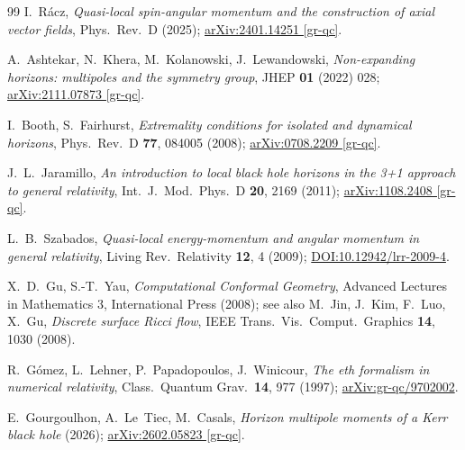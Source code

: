 \documentclass[11pt]{article}
\begin{document}
\begin{thebibliography}{99}
I.~R\'acz,
\emph{Quasi-local spin-angular momentum and the construction of axial
vector fields},
Phys.\ Rev.\ D (2025);
\href{https://arxiv.org/abs/2401.14251}{arXiv:2401.14251 [gr-qc]}.

A.~Ashtekar, N.~Khera, M.~Kolanowski, J.~Lewandowski,
\emph{Non-expanding horizons: multipoles and the symmetry group},
JHEP \textbf{01} (2022) 028;
\href{https://arxiv.org/abs/2111.07873}{arXiv:2111.07873 [gr-qc]}.

I.~Booth, S.~Fairhurst,
\emph{Extremality conditions for isolated and dynamical horizons},
Phys.\ Rev.\ D \textbf{77}, 084005 (2008);
\href{https://arxiv.org/abs/0708.2209}{arXiv:0708.2209 [gr-qc]}.

J.~L.~Jaramillo,
\emph{An introduction to local black hole horizons in the 3+1 approach to
general relativity},
Int.\ J.\ Mod.\ Phys.\ D \textbf{20}, 2169 (2011);
\href{https://arxiv.org/abs/1108.2408}{arXiv:1108.2408 [gr-qc]}.

L.~B.~Szabados,
\emph{Quasi-local energy-momentum and angular momentum in general
relativity},
Living Rev.\ Relativity \textbf{12}, 4 (2009);
\href{https://doi.org/10.12942/lrr-2009-4}{DOI:10.12942/lrr-2009-4}.

X.~D.~Gu, S.-T.~Yau,
\emph{Computational Conformal Geometry},
Advanced Lectures in Mathematics 3, International Press (2008);
see also M.~Jin, J.~Kim, F.~Luo, X.~Gu,
\emph{Discrete surface Ricci flow},
IEEE Trans.\ Vis.\ Comput.\ Graphics \textbf{14}, 1030 (2008).

R.~G\'omez, L.~Lehner, P.~Papadopoulos, J.~Winicour,
\emph{The eth formalism in numerical relativity},
Class.\ Quantum Grav.\ \textbf{14}, 977 (1997);
\href{https://arxiv.org/abs/gr-qc/9702002}{arXiv:gr-qc/9702002}.

E.~Gourgoulhon, A.~Le~Tiec, M.~Casals,
\emph{Horizon multipole moments of a Kerr black hole} (2026);
\href{https://arxiv.org/abs/2602.05823}{arXiv:2602.05823 [gr-qc]}.

\end{thebibliography}
\end{document}
